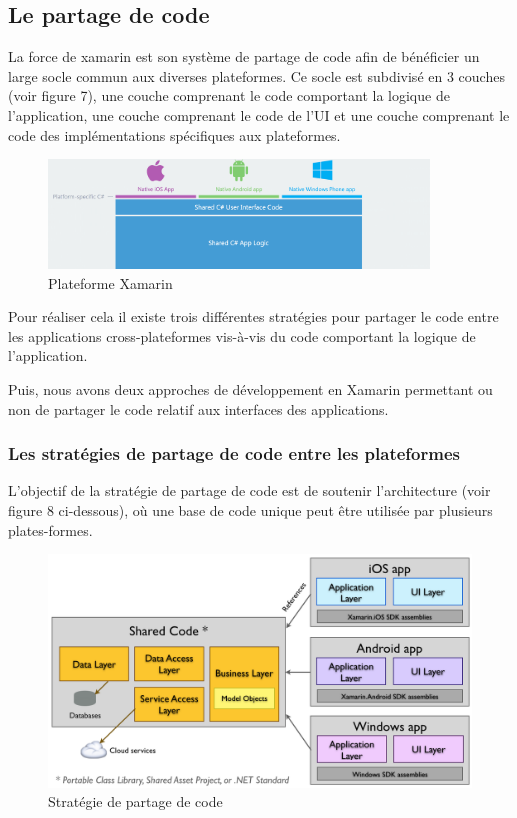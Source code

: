 \documentclass[11]{article}
\begin{document}
\subsection{Le partage de code}
La force de xamarin est son système de partage de code afin de bénéficier un large socle commun aux diverses plateformes. Ce socle est subdivisé en 3 couches (voir figure 7), une couche comprenant le code comportant la logique de l’application, une couche comprenant le code de l’UI et une couche comprenant le code des implémentations spécifiques aux plateformes.   

\begin{figure}[h]
    \centering
    \includegraphics[width=0.9\textwidth]{code-share}
    \caption{Plateforme Xamarin}
    \label{bat}
\end{figure}

 \vspace{0.5cm}
 
 Pour réaliser cela il existe trois différentes stratégies pour partager le code entre les applications cross-plateformes vis-à-vis du code comportant la logique de l’application.

 \vspace{0.5cm}
 
 Puis, nous avons deux approches de développement en Xamarin permettant ou non de partager le code relatif aux interfaces des applications.

\subsubsection{Les stratégies de partage de code entre les plateformes}
L'objectif de la stratégie de partage de code est de soutenir l'architecture (voir figure 8 ci-dessous), où une base de code unique peut être utilisée par plusieurs plates-formes.

\begin{figure}[h]
    \centering
    \includegraphics[width=1\textwidth]{arch-share}
    \caption{Stratégie de partage de code}
    \label{bat}
\end{figure}
\end{document}
